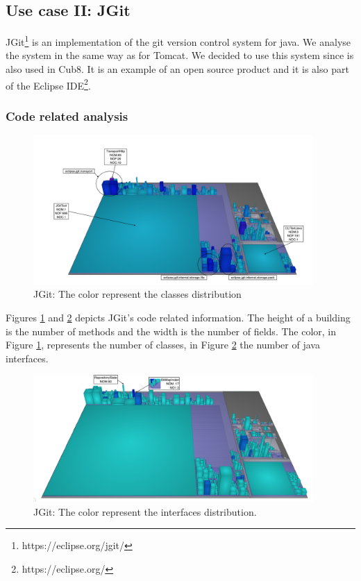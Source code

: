 \documentclass[]{usiinfbachelorproject}
\begin{document}
 

\newpage



\subsection{Use case II: JGit}
JGit\footnote{https://eclipse.org/jgit/} is an implementation of the git version control system for java. We analyse the system in the same way as for Tomcat. We decided to use this system since is also used in Cub8. It is an example of an open source product and it is also part of the Eclipse IDE\footnote{https://eclipse.org/}.


\subsubsection{Code related analysis}


			
\begin{figure}[H]
	\centering
	\includegraphics[width=0.95\textwidth]{images/jgitClass}
	\caption[JGit: Classes]{JGit:  The color represent the classes distribution \label{fig:jgitRel:a}}
\end{figure}





Figures \ref{fig:jgitRel:a}  and \ref{fig:jgitRel:b}  depicts JGit's code related information. The height of a building is the number of methods and the width is the number of fields. The color, in Figure \ref{fig:jgitRel:a}, represents the number of classes, in Figure \ref{fig:jgitRel:b} the number of java interfaces.


\begin{figure}[H]
	\centering
	\includegraphics[width=0.95\textwidth]{images/jgitInterface}
	\caption[Jgit: Interfaces]{JGit: The color represent the interfaces distribution. \label{fig:jgitRel:b}}
\end{figure}
\end{document}
